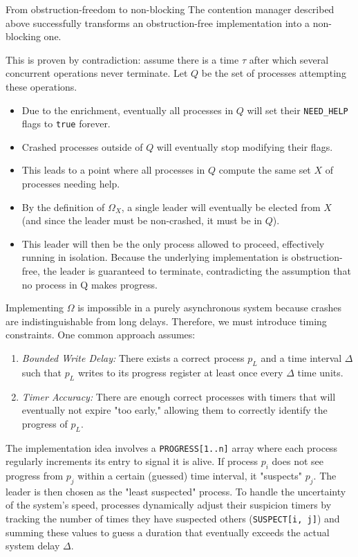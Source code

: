 \begin{Thm}{From obstruction-freedom to non-blocking}{}
    The contention manager described above successfully transforms an obstruction-free implementation into a non-blocking one. 
\begin{demonstration}
    This is proven by contradiction: assume there is a time $\tau$ after which several concurrent operations never terminate. Let $Q$ be the set of processes attempting these operations.
    \begin{itemize}
        \item Due to the enrichment, eventually all processes in $Q$ will set their \texttt{NEED\_HELP} flags to \texttt{true} forever.
        \item Crashed processes outside of $Q$ will eventually stop modifying their flags.
        \item This leads to a point where all processes in $Q$ compute the same set $X$ of processes needing help.
        \item By the definition of $\Omega_X$, a single leader will eventually be elected from $X$ (and since the leader must be non-crashed, it must be in $Q$).
        \item This leader will then be the only process allowed to proceed, effectively running in isolation. Because the underlying implementation is obstruction-free, the leader is guaranteed to terminate, contradicting the assumption that no process in Q makes progress.
    \end{itemize}
\end{demonstration}
\end{Thm}

Implementing $\Omega$ is impossible in a purely asynchronous system because crashes are indistinguishable from long delays. Therefore, we must introduce timing constraints. One common approach assumes:
\begin{enumerate}
    \item \textit{Bounded Write Delay:} There exists a correct process $p_L$ and a time interval $\Delta$ such that $p_L$ writes to its progress register at least once every $\Delta$ time units.
    \item \textit{Timer Accuracy:} There are enough correct processes with timers that will eventually not expire "too early," allowing them to correctly identify the progress of $p_L$.
\end{enumerate}

The implementation idea involves a \texttt{PROGRESS[1..n]} array where each process regularly increments its entry to signal it is alive. If process $p_i$ does not see progress from $p_j$ within a certain (guessed) time interval, it "suspects" $p_j$. The leader is then chosen as the "least suspected" process. To handle the uncertainty of the system's speed, processes dynamically adjust their suspicion timers by tracking the number of times they have suspected others (\texttt{SUSPECT[i, j]}) and summing these values to guess a duration that eventually exceeds the actual system delay $\Delta$.

